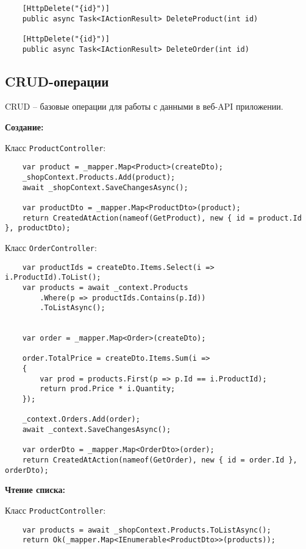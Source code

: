 \documentclass[a4paper,12pt]{report}
\begin{document}
\begin{verbatim}
    [HttpDelete("{id}")]
    public async Task<IActionResult> DeleteProduct(int id)

    [HttpDelete("{id}")]
    public async Task<IActionResult> DeleteOrder(int id)
\end{verbatim}

\subsection{\acs{CRUD}-операции}

\acs{CRUD} -- базовые операции для работы с данными в веб-\acs{API} приложении.

\textbf{Создание:}

Класс \texttt{ProductController}:
\begin{verbatim}
    var product = _mapper.Map<Product>(createDto);
    _shopContext.Products.Add(product);
    await _shopContext.SaveChangesAsync();

    var productDto = _mapper.Map<ProductDto>(product);
    return CreatedAtAction(nameof(GetProduct), new { id = product.Id }, productDto);
\end{verbatim}

Класс \texttt{OrderController}:
\begin{verbatim}
    var productIds = createDto.Items.Select(i => i.ProductId).ToList();
    var products = await _context.Products
        .Where(p => productIds.Contains(p.Id))
        .ToListAsync();

        
    var order = _mapper.Map<Order>(createDto);

    order.TotalPrice = createDto.Items.Sum(i =>
    {
        var prod = products.First(p => p.Id == i.ProductId);
        return prod.Price * i.Quantity;
    });

    _context.Orders.Add(order);
    await _context.SaveChangesAsync();

    var orderDto = _mapper.Map<OrderDto>(order);
    return CreatedAtAction(nameof(GetOrder), new { id = order.Id }, orderDto);
\end{verbatim}

\textbf{Чтение списка:}

Класс \texttt{ProductController}:
\begin{verbatim}
    var products = await _shopContext.Products.ToListAsync();
    return Ok(_mapper.Map<IEnumerable<ProductDto>>(products));
\end{verbatim}
\end{document}
